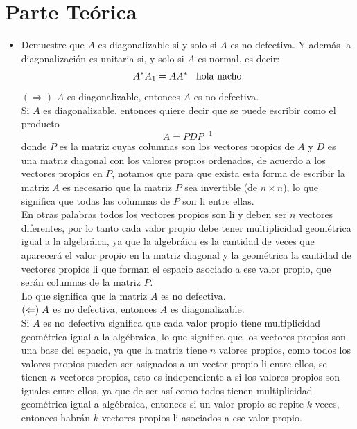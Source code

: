 \documentclass{article}
\begin{document}
\section*{Parte Teórica}
\begin{itemize}
\item Demuestre que $A$ es diagonalizable si y solo si $A$ es no defectiva. Y además la diagonalización es unitaria si, y solo si $A$ es normal, es decir:
$$A^{*}A_{1} = AA^{*}\hspace*{3mm}\text{hola nacho} $$
\((\Rightarrow)\)
$A$ es diagonalizable, entonces $A$ es no defectiva.\\
Si $A$ es diagonalizable, entonces quiere decir que se puede escribir como el producto 
\[A = PDP^{-1}\]
donde $P$ es la matriz cuyas columnas son los vectores propios de $A$ y $D$ es una matriz diagonal con los valores propios ordenados, de acuerdo a los vectores propios en $P$, notamos que para que exista esta forma de escribir la matriz $A$ es necesario que la matriz $P$ sea invertible (de $n\times n$), lo que significa que todas las columnas de $P$ son li entre ellas.\\

En otras palabras todos los vectores propios son li y deben ser $n$ vectores diferentes, por lo tanto cada valor propio debe tener multiplicidad geométrica igual a la algebráica, ya que la algebráica es la cantidad de veces que aparecerá el valor propio en la matriz diagonal y la geométrica la cantidad de vectores propios li que forman el espacio asociado a ese valor propio, que serán columnas de la matriz $P$.\\
Lo que significa que la matriz $A$ es no defectiva.\\

\((\Leftarrow)\hspace*{1mm} A\) es no defectiva, entonces $A$ es diagonalizable.\\

Si $A$ es no defectiva significa que cada valor propio tiene multiplicidad geométrica igual a la algébraica, lo que significa que los vectores propios son una base del espacio, ya que la matriz tiene $n$ valores propios, como todos los valores propios pueden ser asignados a un vector propio li entre ellos, se tienen $n$ vectores propios, esto es independiente a si los valores propios son iguales entre ellos, ya que de ser así como todos tienen multiplicidad geométrica igual a algébraica, entonces si un valor propio se repite $k$ veces, entonces habrán $k$ vectores propios li asociados a ese valor propio.\\


\end{itemize}
\end{document}
